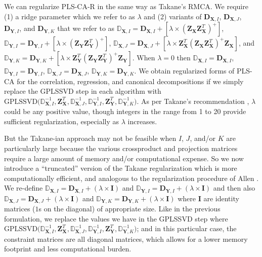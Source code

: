 \documentclass[12pt]{article}
\begin{document}
We can regularize PLS-CA-R in the same way as Takane's RMCA. We require
(1) a ridge parameter which we refer to as \(\lambda\) and (2) variants
of \({\mathbf D}_{{\mathbf X},I}\), \({\mathbf D}_{{\mathbf X},J}\),
\({\mathbf D}_{{\mathbf Y},I}\), and \({\mathbf D}_{{\mathbf Y},K}\)
that we refer to as
\({\mathbb D}_{{\mathbf X},I} = {\mathbf D}_{{\mathbf X},I} + [\lambda \times ({\mathbf Z}_{\mathbf X}{\mathbf Z}_{\mathbf X}^{T})^{+}]\),
\({\mathbb D}_{{\mathbf Y},I} = {\mathbf D}_{{\mathbf Y},I} + [\lambda \times ({\mathbf Z}_{\mathbf Y}{\mathbf Z}_{\mathbf Y}^{T})^{+}]\),
\({\mathbb D}_{{\mathbf X},J} = {\mathbf D}_{{\mathbf X},J} + [\lambda \times {\mathbf Z}_{\mathbf X}^{T}({\mathbf Z}_{\mathbf X}{\mathbf Z}_{\mathbf X}^{T})^{+}{\mathbf Z}_{\mathbf X}]\),
and
\({\mathbb D}_{{\mathbf Y},K} = {\mathbf D}_{{\mathbf Y},K} + [\lambda \times {\mathbf Z}_{\mathbf Y}^{T}({\mathbf Z}_{\mathbf Y}{\mathbf Z}_{\mathbf Y}^{T})^{+}{\mathbf Z}_{\mathbf Y}]\).
When \(\lambda = 0\) then
\({\mathbb D}_{{\mathbf X},I} = {\mathbf D}_{{\mathbf X},I}\),
\({\mathbb D}_{{\mathbf Y},I} = {\mathbf D}_{{\mathbf Y},I}\),
\({\mathbb D}_{{\mathbf X},J} = {\mathbf D}_{{\mathbf X},J}\),
\({\mathbb D}_{{\mathbf Y},K} = {\mathbf D}_{{\mathbf Y},K}\). We obtain
regularized forms of PLS-CA for the correlation, regression, and
canonical decompositions if we simply replace the GPLSSVD step in each
algorithm with
\(\mathrm{GPLSSVD(}{\mathbb D}_{{\mathbf X},I}^{-1},{\mathbf Z}_{\mathbf X}^{T}, {\mathbb D}_{{\mathbf X},J}^{-1}, {\mathbb D}_{{\mathbf Y},I}^{-1},{\mathbf Z}_{\mathbf Y}^{T}, {\mathbb D}_{{\mathbf Y},K}^{-1} \mathrm{)}\).
As per Takane's recommendation \citep{takane_regularized_2006},
\(\lambda\) could be any positive value, though integers in the range
from 1 to 20 provide sufficient regularization, especially as
\(\lambda\) increases.

But the Takane-ian approach may not be feasible when \(I\), \(J\),
and/or \(K\) are particularly large because the various crossproduct and
projection matrices require a large amount of memory and/or
computational expense. So we now introduce a ``truncated'' version of
the Takane regularization which is more computationally efficient, and
analogous to the regularization procedure of Allen
\citep{allen_sparse_2013, allen_generalized_2014}. We re-define
\({\mathbb D}_{{\mathbf X},I} = {\mathbf D}_{{\mathbf X},I} + (\lambda \times {\mathbf I})\)
and
\({\mathbb D}_{{\mathbf Y},I} = {\mathbf D}_{{\mathbf Y},I} + (\lambda \times {\mathbf I})\)
and then also
\({\mathbb D}_{{\mathbf X},J} = {\mathbf D}_{{\mathbf X},J} + (\lambda \times {\mathbf I})\)
and
\({\mathbb D}_{{\mathbf Y},K} = {\mathbf D}_{{\mathbf Y},K} + (\lambda \times {\mathbf I})\)
where \({\mathbf I}\) are identity matrices (\(1\)s on the diagonal) of
appropriate size. Like in the previous formulation, we replace the
values we have in the GPLSSVD step where
\(\mathrm{GPLSSVD(}{\mathbb D}_{{\mathbf X},I}^{-1},{\mathbf Z}_{\mathbf X}^{T}, {\mathbb D}_{{\mathbf X},J}^{-1}, {\mathbb D}_{{\mathbf Y},I}^{-1},{\mathbf Z}_{\mathbf Y}^{T}, {\mathbb D}_{{\mathbf Y},K}^{-1} \mathrm{)}\);
and in this particular case, the constraint matrices are all diagonal
matrices, which allows for a lower memory footprint and less
computational burden.
\end{document}
